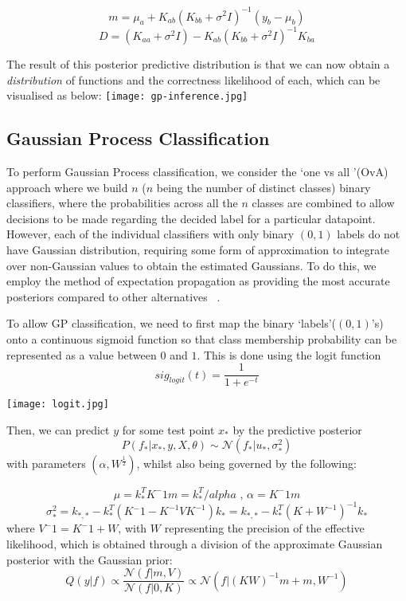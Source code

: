 \documentclass[10pt,sts]{article}
\begin{document}
\begin{multicols}{2}
    $$ m = \mu_a + K_{ab} (K_{bb} + \sigma^2I)^{-1} (y_b - \mu_b) $$
    $$ D = (K_{aa} + \sigma^2I) - K_{ab} (K_{bb}+\sigma^2I)^{-1} K_{ba} $$

    The result of this posterior predictive distribution is that we can now obtain a \textit{distribution} of functions and the correctness likelihood of each, which can be visualised as below:
    \texttt{[image: gp-inference.jpg]}

    \subsection{Gaussian Process Classification} 
    To perform Gaussian Process classification, we consider the \lq one vs all \rq (OvA) approach where we build $n$ ($n$ being the number of distinct classes) binary classifiers, where the probabilities across all the $n$ classes are combined to allow decisions to be made regarding the decided label for a particular datapoint. However, each of the individual classifiers with only binary $(0, 1)$ labels do not have Gaussian distribution, requiring some form of approximation to integrate over non-Gaussian values to obtain the estimated Gaussians. To do this, we employ the method of expectation propagation as providing the most accurate posteriors compared to other alternatives ~\citep{nickisch08}. 

    To allow GP classification, we need to first map the binary \lq labels\rq ($(0, 1)$'s) onto a continuous sigmoid function so that class membership probability can be represented as a value between $0$ and $1$. This is done using the logit function $$sig_{logit}(t) = \frac{1}{1+e^{-t}}$$


    \texttt{[image: logit.jpg]}

    Then, we can predict $y$ for some test point $x_*$ by the predictive posterior $$P(f_* | x_*, y, X, \theta) \sim \mathcal{N}(f_* | u_*, \sigma^2_*)$$
    with parameters $(\alpha, W^{\frac{1}{2}})$, whilst also being governed by the following:

    $$\mu = k^T_*K^-1m = k^T_*/alpha \textrm{ ,     } \alpha = K^-1m $$
    $$ \sigma^2_* = k_{*,*} - k^T_*(K{^-1}-K^{-1}VK^{-1})k_* = k_{*,*} - k^T_*(K+W^{-1})^{-1}k_*$$
    where $ V^-1 = K^-1 + W$, with $W$ representing the precision of the effective likelihood, which is obtained through a division of the approximate Gaussian posterior with the Gaussian prior:
    $$ Q(y|f) \propto \frac{\mathcal{N}(f|m, V)}{\mathcal{N}(f|0,K)} \propto \mathcal{N}(f | (KW)^{-1} m + m, W^{-1})$$
    

\end{multicols}
\end{document}
